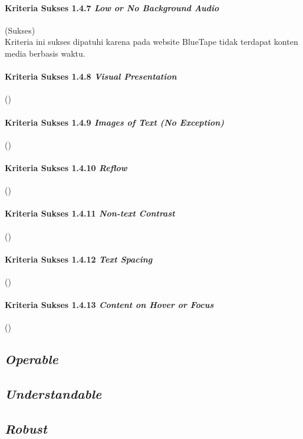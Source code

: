 \paragraph{Kriteria Sukses 1.4.7 \textit{Low or No Background Audio}}
\label{par:kepatuhan_bluetape_kriteria_sukses_1.4.7}
(Sukses)\\

Kriteria ini sukses dipatuhi karena pada website BlueTape tidak terdapat konten media berbasis waktu.

\paragraph{Kriteria Sukses 1.4.8 \textit{Visual Presentation}}
\label{par:kepatuhan_bluetape_kriteria_sukses_1.4.8}
()\\

\paragraph{Kriteria Sukses 1.4.9 \textit{Images of Text (No Exception)}}
\label{par:kepatuhan_bluetape_kriteria_sukses_1.4.9}
()\\

\paragraph{Kriteria Sukses 1.4.10 \textit{Reflow}}
\label{par:kepatuhan_bluetape_kriteria_sukses_1.4.10}
()\\

\paragraph{Kriteria Sukses 1.4.11 \textit{Non-text Contrast}}
\label{par:kepatuhan_bluetape_kriteria_sukses_1.4.11}
()\\

\paragraph{Kriteria Sukses 1.4.12 \textit{Text Spacing}}
\label{par:kepatuhan_bluetape_kriteria_sukses_1.4.12}
()\\

\paragraph{Kriteria Sukses 1.4.13 \textit{Content on Hover or Focus}}
\label{par:kepatuhan_bluetape_kriteria_sukses_1.4.13}
()\\

\subsection{\textit{Operable}}
\label{subsec:kepatuhan_bluetape_operable}

\subsection{\textit{Understandable}}
\label{subsec:kepatuhan_bluetape_understandable}

\subsection{\textit{Robust}}
\label{subsec:kepatuhan_bluetape_robust}